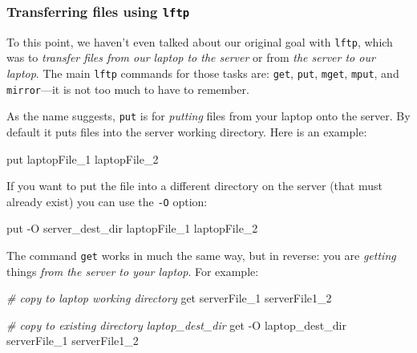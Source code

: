 \documentclass[]{krantz}
\makeatletter
\newenvironment{Shaded}{\begin{snugshade}}{\end{snugshade}}
\newcommand{\CommentTok}[1]{\textcolor[rgb]{0.37,0.37,0.37}{\textit{#1}}}
\newcommand{\ExtensionTok}[1]{#1}
\newcommand{\NormalTok}[1]{#1}
\newenvironment{kframe}{%
\medskip{}
\setlength{\fboxsep}{.8em}
 \def\at@end@of@kframe{}%
 \ifinner\ifhmode%
  \def\at@end@of@kframe{\end{minipage}}%
  \begin{minipage}{\columnwidth}%
 \fi\fi%
 \def\FrameCommand##1{\hskip\@totalleftmargin \hskip-\fboxsep
 \colorbox{shadecolor}{##1}\hskip-\fboxsep
     \hskip-\linewidth \hskip-\@totalleftmargin \hskip\columnwidth}%
 \MakeFramed {\advance\hsize-\width
   \@totalleftmargin\z@ \linewidth\hsize
   \@setminipage}}%
 {\par\unskip\endMakeFramed%
 \at@end@of@kframe}
\renewenvironment{Shaded}{\begin{kframe}}{\end{kframe}}
\makeatother
\begin{document}
\hypertarget{transferring-files-using-lftp}{%
\subsubsection{\texorpdfstring{Transferring files using \texttt{lftp}}{Transferring files using lftp}}\label{transferring-files-using-lftp}}

To this point, we haven't even talked about our original goal with \texttt{lftp}, which
was to \emph{transfer files from our laptop to the server} or from \emph{the server to our laptop}.
The main \texttt{lftp} commands for those tasks are: \texttt{get}, \texttt{put}, \texttt{mget}, \texttt{mput}, and \texttt{mirror}---it is
not too much to have to remember.

As the name suggests, \texttt{put} is for \emph{putting} files from your laptop onto the server. By default it
puts files into the server working directory. Here is an example:

\begin{Shaded}
\begin{Highlighting}[]
\ExtensionTok{put}\NormalTok{ laptopFile_1 laptopFile_2}
\end{Highlighting}
\end{Shaded}

If you want to put the file into a different directory on the server (that must already exist)
you can use the \texttt{-O} option:

\begin{Shaded}
\begin{Highlighting}[]
\ExtensionTok{put}\NormalTok{ -O server_dest_dir laptopFile_1 laptopFile_2}
\end{Highlighting}
\end{Shaded}

The command \texttt{get} works in much the same way, but in reverse: you are \emph{getting} things
\emph{from the server to your laptop}. For example:

\begin{Shaded}
\begin{Highlighting}[]
\CommentTok{# copy to laptop working directory}
\ExtensionTok{get}\NormalTok{ serverFile_1 serverFile1_2}

\CommentTok{# copy to existing directory laptop_dest_dir }
\ExtensionTok{get}\NormalTok{ -O laptop_dest_dir serverFile_1 serverFile1_2}
\end{Highlighting}
\end{Shaded}
\end{document}
